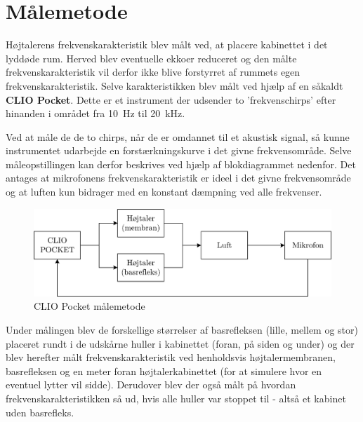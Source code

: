 \chapter{Målemetode}
\label{ch:measurements}
Højtalerens frekvenskarakteristik blev målt ved, at placere kabinettet i det lyddøde rum. Herved blev eventuelle ekkoer reduceret og den målte frekvenskarakteristik vil derfor ikke blive forstyrret af rummets egen frekvenskarakteristik. Selve karakteristikken blev målt ved hjælp af en såkaldt \textbf{CLIO Pocket}. Dette er et instrument der udsender to 'frekvenschirps' efter hinanden i området fra \SI{10}{\hertz} til \SI{20}{\kilo\hertz}.

Ved at måle de de to chirps, når de er omdannet til et akustisk signal, så kunne instrumentet udarbejde en forstærkningskurve i det givne frekvensområde. Selve måleopstillingen kan derfor beskrives ved hjælp af blokdiagrammet nedenfor. Det antages at mikrofonens frekvenskarakteristik er ideel i det givne frekvensområde og at luften kun bidrager med en konstant dæmpning ved alle frekvenser.
\begin{figure}[H]
	\centering
	\includegraphics[width=\textwidth]{Pics/CLIOFeedback}
	\caption{CLIO Pocket målemetode}
\end{figure}

Under målingen blev de forskellige størrelser af basrefleksen (lille, mellem og stor) placeret rundt i de udskårne huller i kabinettet (foran, på siden og under) og der blev herefter målt frekvenskarakteristik ved henholdsvis højtalermembranen, basrefleksen og en meter foran højtalerkabinettet (for at simulere hvor en eventuel lytter vil sidde). Derudover blev der også målt på hvordan frekvenskarakteristikken så ud, hvis alle huller var stoppet til - altså et kabinet uden basrefleks.